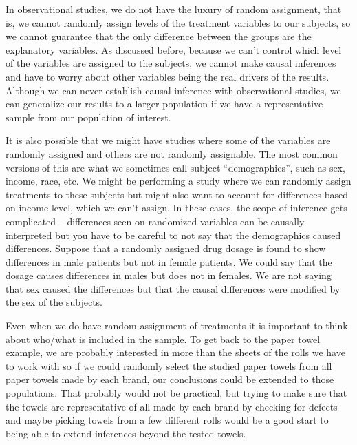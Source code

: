 \documentclass[]{book}
\theoremstyle{definition}
\theoremstyle{definition}
\theoremstyle{remark}
\begin{document}
In observational studies, we do not have the luxury of random
assignment, that is, we cannot randomly assign levels of the treatment
variables to our subjects, so we cannot guarantee that the only
difference between the groups are the explanatory variables. As
discussed before, because we can't control which level of the variables
are assigned to the subjects, we cannot make causal inferences and have
to worry about other variables being the real drivers of the results.
Although we can never establish causal inference with observational
studies, we can generalize our results to a larger population if we have
a representative sample from our population of interest.

It is also possible that we might have studies where some of the
variables are randomly assigned and others are not randomly assignable.
The most common versions of this are what we sometimes call subject
``demographics'', such as sex, income, race, etc. We might be performing
a study where we can randomly assign treatments to these subjects but
might also want to account for differences based on income level, which
we can't assign. In these cases, the scope of inference gets complicated
-- differences seen on randomized variables can be causally interpreted
but you have to be careful to not say that the demographics caused
differences. Suppose that a randomly assigned drug dosage is found to
show differences in male patients but not in female patients. We could
say that the dosage causes differences in males but does not in females.
We are not saying that sex caused the differences but that the causal
differences were modified by the sex of the subjects.

Even when we do have random assignment of treatments it is important to
think about who/what is included in the sample. To get back to the paper
towel example, we are probably interested in more than the sheets of the
rolls we have to work with so if we could randomly select the studied
paper towels from all paper towels made by each brand, our conclusions
could be extended to those populations. That probably would not be
practical, but trying to make sure that the towels are representative of
all made by each brand by checking for defects and maybe picking towels
from a few different rolls would be a good start to being able to extend
inferences beyond the tested towels.
\end{document}
